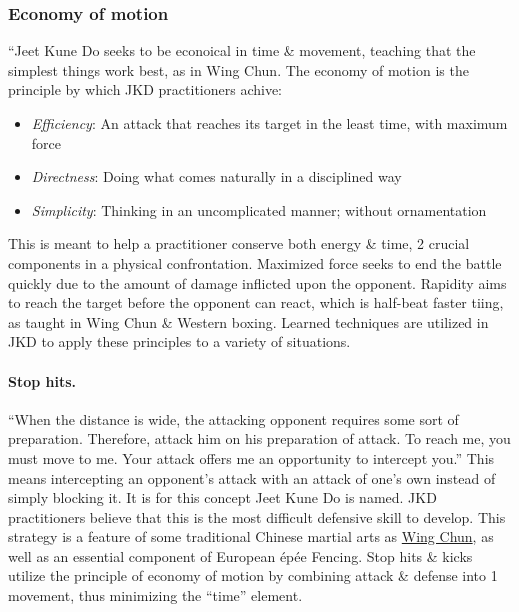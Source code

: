 \documentclass[oneside]{book}
\numberwithin{equation}{section}
\begin{document}
\subsubsection{Economy of motion}
``Jeet Kune Do seeks to be econoical in time \& movement, teaching that the simplest things work best, as in Wing Chun. The economy of motion is the principle by which JKD practitioners achive:
\begin{itemize}
	\item \textit{Efficiency}: An attack that reaches its target in the least time, with maximum force
	\item \textit{Directness}: Doing what comes naturally in a disciplined way
	\item \textit{Simplicity}: Thinking in an uncomplicated manner; without ornamentation
\end{itemize}
This is meant to help a practitioner conserve both energy \& time, 2 crucial components in a physical confrontation. Maximized force seeks to end the battle quickly due to the amount of damage inflicted upon the opponent. Rapidity aims to reach the target before the opponent can react, which is half-beat faster tiing, as taught in Wing Chun \& Western boxing. Learned techniques are utilized in JKD to apply these principles to a variety of situations.

\paragraph{Stop hits.} ``When the distance is wide, the attacking opponent requires some sort of preparation. Therefore, attack him on his preparation of attack. To reach me, you must move to me. Your attack offers me an opportunity to intercept you.'' This means intercepting an opponent's attack with an attack of one's own instead of simply blocking it. It is for this concept Jeet Kune Do is named. JKD practitioners believe that this is the most difficult defensive skill to develop. This strategy is a feature of some traditional Chinese martial arts as \href{https://en.wikipedia.org/wiki/Wing_Chun}{Wing Chun}, as well as an essential component of European \'ep\'ee Fencing. Stop hits \& kicks utilize the principle of economy of motion by combining attack \& defense into 1 movement, thus minimizing the ``time'' element.
\end{document}
